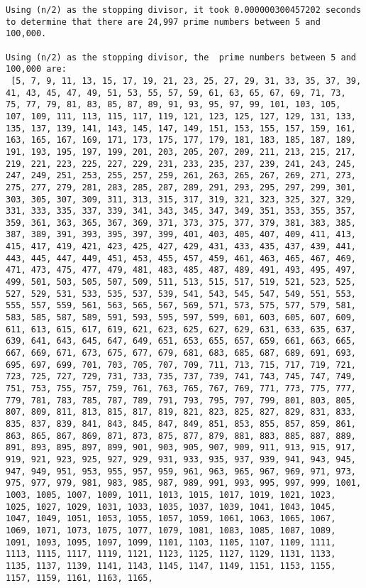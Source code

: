 \documentclass[11pt]{article}
\begin{document}
    \begin{Verbatim}[commandchars=\\\{\}]
Using (n/2) as the stopping divisor, it took 0.000000300457202 seconds to determine that there are 24,997 prime numbers between 5 and 100,000.

Using (n/2) as the stopping divisor, the  prime numbers between 5 and 100,000 are:
 [5, 7, 9, 11, 13, 15, 17, 19, 21, 23, 25, 27, 29, 31, 33, 35, 37, 39, 41, 43, 45, 47, 49, 51, 53, 55, 57, 59, 61, 63, 65, 67, 69, 71, 73, 75, 77, 79, 81, 83, 85, 87, 89, 91, 93, 95, 97, 99, 101, 103, 105, 107, 109, 111, 113, 115, 117, 119, 121, 123, 125, 127, 129, 131, 133, 135, 137, 139, 141, 143, 145, 147, 149, 151, 153, 155, 157, 159, 161, 163, 165, 167, 169, 171, 173, 175, 177, 179, 181, 183, 185, 187, 189, 191, 193, 195, 197, 199, 201, 203, 205, 207, 209, 211, 213, 215, 217, 219, 221, 223, 225, 227, 229, 231, 233, 235, 237, 239, 241, 243, 245, 247, 249, 251, 253, 255, 257, 259, 261, 263, 265, 267, 269, 271, 273, 275, 277, 279, 281, 283, 285, 287, 289, 291, 293, 295, 297, 299, 301, 303, 305, 307, 309, 311, 313, 315, 317, 319, 321, 323, 325, 327, 329, 331, 333, 335, 337, 339, 341, 343, 345, 347, 349, 351, 353, 355, 357, 359, 361, 363, 365, 367, 369, 371, 373, 375, 377, 379, 381, 383, 385, 387, 389, 391, 393, 395, 397, 399, 401, 403, 405, 407, 409, 411, 413, 415, 417, 419, 421, 423, 425, 427, 429, 431, 433, 435, 437, 439, 441, 443, 445, 447, 449, 451, 453, 455, 457, 459, 461, 463, 465, 467, 469, 471, 473, 475, 477, 479, 481, 483, 485, 487, 489, 491, 493, 495, 497, 499, 501, 503, 505, 507, 509, 511, 513, 515, 517, 519, 521, 523, 525, 527, 529, 531, 533, 535, 537, 539, 541, 543, 545, 547, 549, 551, 553, 555, 557, 559, 561, 563, 565, 567, 569, 571, 573, 575, 577, 579, 581, 583, 585, 587, 589, 591, 593, 595, 597, 599, 601, 603, 605, 607, 609, 611, 613, 615, 617, 619, 621, 623, 625, 627, 629, 631, 633, 635, 637, 639, 641, 643, 645, 647, 649, 651, 653, 655, 657, 659, 661, 663, 665, 667, 669, 671, 673, 675, 677, 679, 681, 683, 685, 687, 689, 691, 693, 695, 697, 699, 701, 703, 705, 707, 709, 711, 713, 715, 717, 719, 721, 723, 725, 727, 729, 731, 733, 735, 737, 739, 741, 743, 745, 747, 749, 751, 753, 755, 757, 759, 761, 763, 765, 767, 769, 771, 773, 775, 777, 779, 781, 783, 785, 787, 789, 791, 793, 795, 797, 799, 801, 803, 805, 807, 809, 811, 813, 815, 817, 819, 821, 823, 825, 827, 829, 831, 833, 835, 837, 839, 841, 843, 845, 847, 849, 851, 853, 855, 857, 859, 861, 863, 865, 867, 869, 871, 873, 875, 877, 879, 881, 883, 885, 887, 889, 891, 893, 895, 897, 899, 901, 903, 905, 907, 909, 911, 913, 915, 917, 919, 921, 923, 925, 927, 929, 931, 933, 935, 937, 939, 941, 943, 945, 947, 949, 951, 953, 955, 957, 959, 961, 963, 965, 967, 969, 971, 973, 975, 977, 979, 981, 983, 985, 987, 989, 991, 993, 995, 997, 999, 1001, 1003, 1005, 1007, 1009, 1011, 1013, 1015, 1017, 1019, 1021, 1023, 1025, 1027, 1029, 1031, 1033, 1035, 1037, 1039, 1041, 1043, 1045, 1047, 1049, 1051, 1053, 1055, 1057, 1059, 1061, 1063, 1065, 1067, 1069, 1071, 1073, 1075, 1077, 1079, 1081, 1083, 1085, 1087, 1089, 1091, 1093, 1095, 1097, 1099, 1101, 1103, 1105, 1107, 1109, 1111, 1113, 1115, 1117, 1119, 1121, 1123, 1125, 1127, 1129, 1131, 1133, 1135, 1137, 1139, 1141, 1143, 1145, 1147, 1149, 1151, 1153, 1155, 1157, 1159, 1161, 1163, 1165, 
\end{Verbatim}
\end{document}
